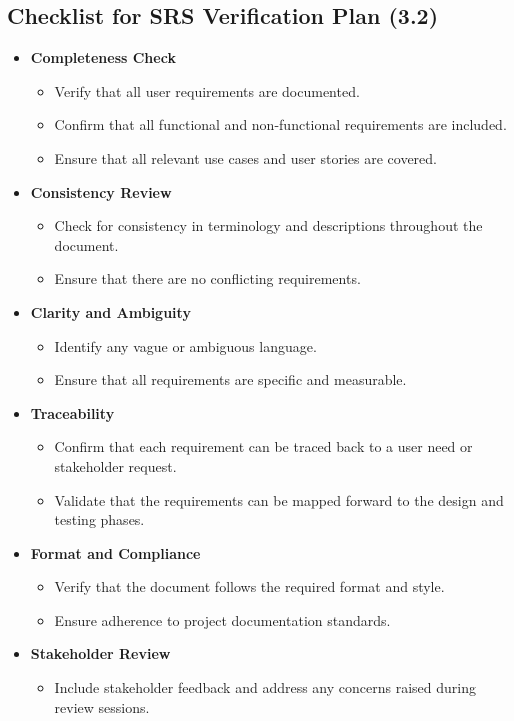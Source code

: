 \documentclass[12pt, titlepage]{article}
\begin{document}
\subsection*{Checklist for SRS Verification Plan (3.2)}
\begin{itemize}
    \item \textbf{Completeness Check}
    \begin{itemize}
        \item Verify that all user requirements are documented.
        \item Confirm that all functional and non-functional requirements are included.
        \item Ensure that all relevant use cases and user stories are covered.
    \end{itemize}
    \item \textbf{Consistency Review}
    \begin{itemize}
        \item Check for consistency in terminology and descriptions throughout the document.
        \item Ensure that there are no conflicting requirements.
    \end{itemize}
    \item \textbf{Clarity and Ambiguity}
    \begin{itemize}
        \item Identify any vague or ambiguous language.
        \item Ensure that all requirements are specific and measurable.
    \end{itemize}
    \item \textbf{Traceability}
    \begin{itemize}
        \item Confirm that each requirement can be traced back to a user need or stakeholder request.
        \item Validate that the requirements can be mapped forward to the design and testing phases.
    \end{itemize}
    \item \textbf{Format and Compliance}
    \begin{itemize}
        \item Verify that the document follows the required format and style.
        \item Ensure adherence to project documentation standards.
    \end{itemize}
    \item \textbf{Stakeholder Review}
    \begin{itemize}
        \item Include stakeholder feedback and address any concerns raised during review sessions.
    \end{itemize}
\end{itemize}
\end{document}
